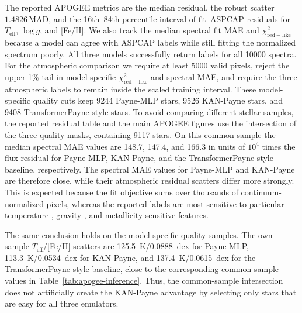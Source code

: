 \documentclass[universe,article,submit,pdftex,moreauthors]{Definitions/mdpi}
\begin{document}
The reported APOGEE metrics are the median residual, the robust scatter
$1.4826\,\mathrm{MAD}$, and the 16th--84th percentile interval of
fit--ASPCAP residuals for $T_{\mathrm{eff}}$, $\log g$, and [Fe/H]. We also
track the median spectral fit MAE and $\chi^2_{\mathrm{red-like}}$ because a
model can agree with ASPCAP labels while still fitting the normalized spectrum
poorly. All three models successfully return labels for all 10000 spectra. For
the atmospheric
comparison we require at least 5000 valid pixels, reject the upper 1\% tail in
model-specific $\chi^2_{\mathrm{red-like}}$ and spectral MAE, and require the
three atmospheric labels to remain inside the scaled training interval. These
model-specific quality cuts keep 9244 Payne-MLP stars, 9526 KAN-Payne stars,
and 9408 TransformerPayne-style stars. To avoid comparing different stellar
samples, the reported residual table and the main APOGEE figures use the
intersection of the three quality masks, containing 9117 stars. On this common
sample the median spectral MAE values are 148.7, 147.4, and 166.3 in units of
$10^4$ times the flux residual for Payne-MLP, KAN-Payne, and the
TransformerPayne-style baseline, respectively. The spectral MAE values for
Payne-MLP and KAN-Payne are therefore close, while their atmospheric residual
scatters differ more strongly. This is expected because the fit objective sums
over thousands of continuum-normalized pixels, whereas the reported labels are
most sensitive to particular temperature-, gravity-, and metallicity-sensitive
features.

The same conclusion holds on the model-specific quality samples. The own-sample
$T_{\mathrm{eff}}$/[Fe/H] scatters are 125.5~K/0.0888~dex for Payne-MLP,
113.3~K/0.0534~dex for KAN-Payne, and 137.4~K/0.0615~dex for the
TransformerPayne-style baseline, close to the corresponding common-sample
values in Table~\ref{tab:apogee-inference}. Thus, the common-sample
intersection does not artificially create the KAN-Payne advantage by selecting
only stars that are easy for all three emulators.
\end{document}
